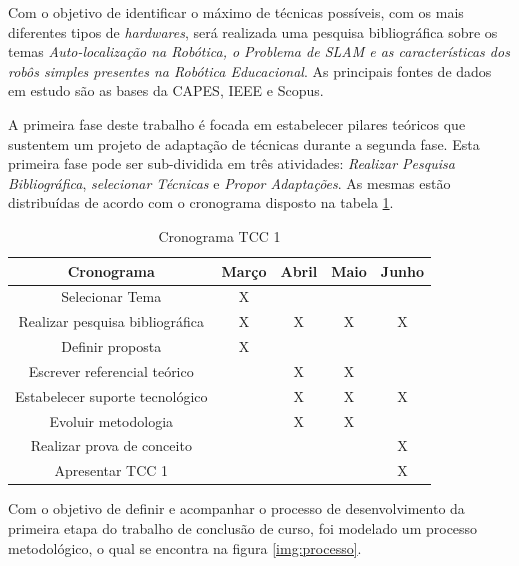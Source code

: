 Com o objetivo de identificar o máximo de técnicas possíveis, com os mais diferentes tipos de \textit{hardwares}, será realizada uma pesquisa bibliográfica sobre os temas \textit{Auto-localização na Robótica, o Problema de SLAM e as características dos robôs simples presentes na Robótica Educacional}. As principais fontes de dados em estudo são as bases da CAPES, IEEE e Scopus.

A primeira fase deste trabalho é focada em estabelecer pilares teóricos que sustentem um projeto de adaptação de técnicas durante a segunda fase. Esta primeira fase pode ser sub-dividida em três atividades: \textit{Realizar Pesquisa Bibliográfica}, \textit{selecionar Técnicas} e \textit{Propor Adaptações}. As mesmas estão distribuídas de acordo com o cronograma disposto na tabela \ref{tab:cronograma}.

\begin{table}[H]
	\centering
	\begin{tabular}{|c|c|c|c|c|}
		\hline
		\textbf{Cronograma}             & \textbf{Março} & \textbf{Abril} & \textbf{Maio} & \textbf{Junho} \\ \hline
		Selecionar Tema                 & X              &                &               &                \\ \hline
		Realizar pesquisa bibliográfica & X              & X              & X             & X              \\ \hline
		Definir proposta                & X              &                &               &                \\ \hline
		Escrever referencial teórico    &                & X              & X             &                \\ \hline
		Estabelecer suporte tecnológico &                & X              & X             & X              \\ \hline
		Evoluir metodologia             &                & X              & X             &                \\ \hline
		Realizar prova de conceito      &                &                &               & X              \\ \hline
		Apresentar TCC 1                &                &                &               & X              \\ \hline
	\end{tabular}
	\caption{Cronograma TCC 1}
	\label{tab:cronograma}
\end{table}

Com o objetivo de definir e acompanhar o processo de desenvolvimento da primeira etapa do trabalho de conclusão de curso, foi modelado um processo metodológico, o qual se encontra na figura \ref{img:processo}.

